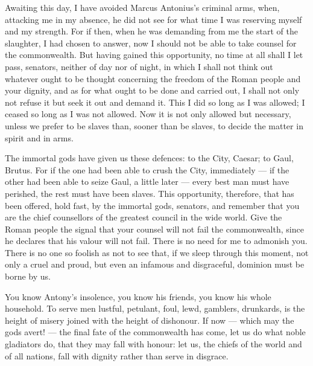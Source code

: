 Awaiting this day, I have avoided Marcus Antonius's criminal arms, when, attacking me in my absence, he did not see for what time I was reserving myself and my strength. For if then, when he was demanding from me the start of the slaughter, I had chosen to answer, now I should not be able to take counsel for the commonwealth. But having gained this opportunity, no time at all shall I let pass, senators, neither of day nor of night, in which I shall not think out whatever ought to be thought concerning the freedom of the Roman people and your dignity, and as for what ought to be done and carried out, I shall not only not refuse it but seek it out and demand it. This I did so long as I was allowed; I ceased so long as I was not allowed. Now it is not only allowed but necessary, unless we prefer to be slaves than, sooner than be slaves, to decide the matter in spirit and in arms.

 The immortal gods have given us these defences: to the City, Caesar; to Gaul, Brutus. For if the one had been able to crush the City, immediately --- if the other had been able to seize Gaul, a little later --- every best man must have perished, the rest must have been slaves. This opportunity, therefore, that has been offered, hold fast, by the immortal gods, senators, and remember that you are the chief counsellors of the greatest council in the wide world. Give the Roman people the signal that your counsel will not fail the commonwealth, since he declares that his valour will not fail. There is no need for me to admonish you. There is no one so foolish as not to see that, if we sleep through this moment, not only a cruel and proud, but even an infamous and disgraceful, dominion must be borne by us.

 You know Antony's insolence, you know his friends, you know his whole household. To serve men lustful, petulant, foul, lewd, gamblers, drunkards, is the height of misery joined with the height of dishonour. If now --- which may the gods avert! --- the final fate of the commonwealth has come, let us do what noble gladiators do, that they may fall with honour: let us, the chiefs of the world and of all nations, fall with dignity rather than serve in disgrace.

